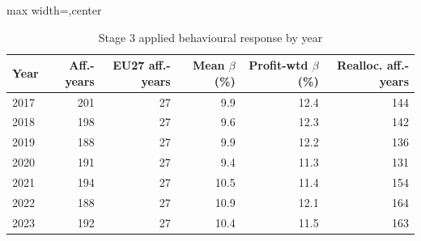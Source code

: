 \begin{table}[H]
\centering
\footnotesize
\setlength{\tabcolsep}{2pt}
\caption{Stage 3 applied behavioural response by year}
\label{tab:app_stage3_behaviour_by_year}
\begin{adjustbox}{max width=\textwidth,center}
\begin{tabular}{@{}lrrrrr@{}}
\toprule
Year & Aff.-years & EU27 aff.-years & Mean $\beta$ (\%) & Profit-wtd $\beta$ (\%) & Realloc. aff.-years \\
\midrule
2017 & 201 & 27 &  9.9 & 12.4 & 144 \\
2018 & 198 & 27 &  9.6 & 12.3 & 142 \\
2019 & 188 & 27 &  9.9 & 12.2 & 136 \\
2020 & 191 & 27 &  9.4 & 11.3 & 131 \\
2021 & 194 & 27 & 10.5 & 11.4 & 154 \\
2022 & 188 & 27 & 10.9 & 12.1 & 164 \\
2023 & 192 & 27 & 10.4 & 11.5 & 163 \\
\bottomrule
\end{tabular}
\end{adjustbox}
\end{table}

